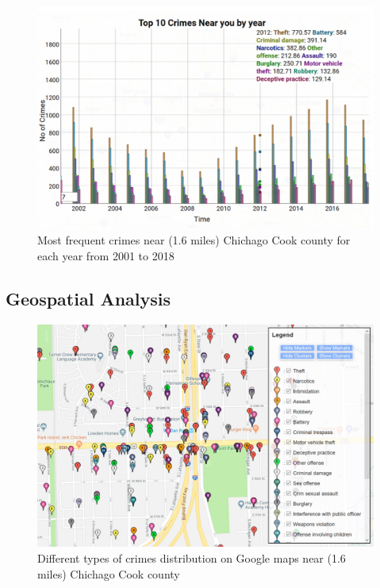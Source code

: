 \begin{figure}[htb]
	\centering\includegraphics[width=\columnwidth]{../images/time3.jpg}
	\caption{Most frequent crimes near (1.6 miles) Chichago Cook county for each year from 2001 to 2018}\label{fig:year-top10crimes-local}
\end{figure}


\subsection{Geospatial Analysis}

\begin{figure}[htb]
	\centering\includegraphics[width=\columnwidth]{../images/geo1.jpg}
	\caption{Different types of crimes distribution on Google maps near (1.6 miles) Chichago Cook county}\label{fig:time-totalCrime}
\end{figure}

